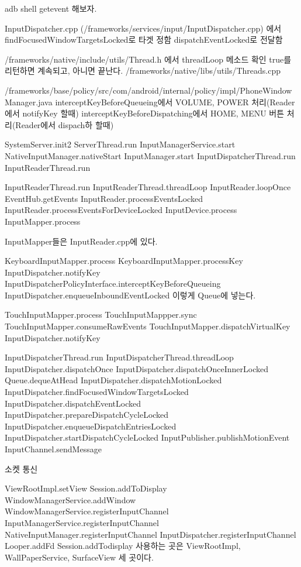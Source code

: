 adb shell getevent 해보자.

InputDispatcher.cpp (/frameworks/services/input/InputDispatcher.cpp) 에서 
findFocusedWindowTargetsLocked로 타겟 정함
dispatchEventLocked로 전달함

/frameworks/native/include/utils/Thread.h 에서 threadLoop 메소드 확인
true를 리턴하면 계속되고, 아니면 끝난다.
/frameworks/native/libs/utils/Threads.cpp

/frameworks/base/policy/src/com/android/internal/policy/impl/PhoneWindowManager.java
interceptKeyBeforeQueueing에서 VOLUME, POWER 처리(Reader에서 notifyKey 할때)
interceptKeyBeforeDispatching에서  HOME, MENU 버튼 처리(Reader에서 dispach하 할때)

SystemServer.init2
	ServerThread.run
		InputManagerService.start
			NativeInputManager.nativeStart
				InputManager.start
					InputDispatcherThread.run
					InputReaderThread.run
	

InputReaderThread.run
	InputReaderThread.threadLoop
		InputReader.loopOnce
			EventHub.getEvents
			InputReader.processEventsLocked
				InputReader.processEventsForDeviceLocked
					InputDevice.process
						InputMapper.process
						
InputMapper들은 InputReader.cpp에 있다.
						
KeyboardInputMapper.process
	KeyboardInputMapper.processKey
		InputDispatcher.notifyKey
			InputDispatcherPolicyInterface.interceptKeyBeforeQueueing
			InputDispatcher.enqueueInboundEventLocked
이렇게 Queue에 넣는다.

			
TouchInputMapper.process			
	TouchInputMappper.sync
		TouchInputMapper.consumeRawEvents
			TouchInputMapper.dispatchVirtualKey
				InputDispatcher.notifyKey
				
				
InputDispatcherThread.run
	InputDispatcherThread.threadLoop				
		InputDispatcher.dispatchOnce
			InputDispatcher.dispatchOnceInnerLocked
				Queue.dequeAtHead
				InputDispatcher.dispatchMotionLocked
					InputDispatcher.findFocusedWindowTargetsLocked
					InputDispatcher.dispatchEventLocked
						InputDispatcher.prepareDispatchCycleLocked
							InputDispatcher.enqueueDispatchEntriesLocked
								InputDispatcher.startDispatchCycleLocked
									InputPublisher.publishMotionEvent
										InputChannel.sendMessage

소켓 통신

ViewRootImpl.setView
	Session.addToDisplay
		WindowManagerService.addWindow
			WindowManagerService.registerInputChannel										
				InputManagerService.registerInputChannel							
					NativeInputManager.registerInputChannel					
						InputDispatcher.registerInputChannel
							Looper.addFd
Session.addTodisplay 사용하는 곳은
ViewRootImpl, WallPaperService, SurfaceView 세 곳이다.
	
